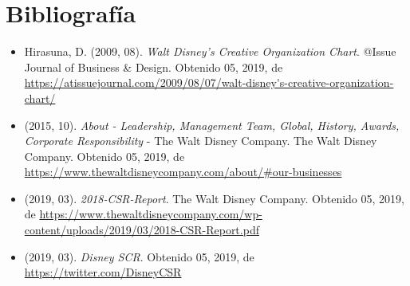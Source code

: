 \section{Bibliografía}

\begin{itemize}

\item
Hirasuna, D. (2009, 08). \textit{Walt Disney’s Creative Organization Chart}. @Issue Journal of Business \& Design. Obtenido 05, 2019, de \url{https://atissuejournal.com/2009/08/07/walt-disney's-creative-organization-chart/}

\item
(2015, 10). \textit{About - Leadership, Management Team, Global, History, Awards, Corporate Responsibility} - The Walt Disney Company. The Walt Disney Company. Obtenido 05, 2019, de \url{https://www.thewaltdisneycompany.com/about/#our-businesses}

\item
(2019, 03). \textit{2018-CSR-Report}. The Walt Disney Company. Obtenido 05, 2019, de \url{https://www.thewaltdisneycompany.com/wp-content/uploads/2019/03/2018-CSR-Report.pdf}

\item
(2019, 03). \textit{Disney SCR}. Obtenido 05, 2019, de \url{https://twitter.com/DisneyCSR}


\end{itemize}